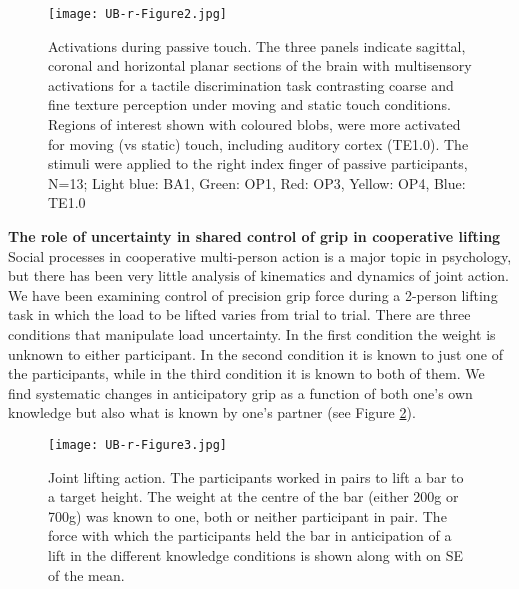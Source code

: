 \begin{figure}
	\centering
	\texttt{[image: UB-r-Figure2.jpg]}
	\caption{Activations during passive touch.  The three panels indicate sagittal, coronal and horizontal planar sections of the brain with multisensory activations for a tactile discrimination task contrasting coarse and fine texture perception under moving and static touch conditions. Regions of interest shown with coloured blobs, were more activated for moving (vs static) touch, including auditory cortex (TE1.0). The stimuli were applied to the right index finger of passive participants, N=13; Light blue: BA1, Green: OP1, Red: OP3, Yellow: OP4, Blue: TE1.0}
	\label{fig:ActivationsDuringPassiveTouch}
\end{figure}

\textbf{The role of uncertainty in shared control of grip in cooperative lifting}
Social processes in cooperative multi-person action is a major topic in psychology, but there has been very little analysis of kinematics and dynamics of joint action. We have been examining control of precision grip force during a 2-person lifting task in which the load to be lifted varies from trial to trial. There are three conditions that manipulate load uncertainty. In the first condition the weight is unknown to either participant. In the second condition it is known to just one of the participants, while in the third condition it is known to both of them.  We find systematic changes in anticipatory grip as a function of both one’s own knowledge but also what is known by one’s partner (see Figure \ref{fig:JointLiftingAction}).

\begin{figure}
	\centering
	\texttt{[image: UB-r-Figure3.jpg]}
	\caption{Joint lifting action. The participants worked in pairs to lift a bar to a target height. The weight at the centre of the bar (either 200g or 700g) was known to one, both or neither participant in pair. The force with which the participants held the bar in anticipation of a lift in the different knowledge conditions is shown along with on SE of the mean.}
	\label{fig:JointLiftingAction}
\end{figure}


